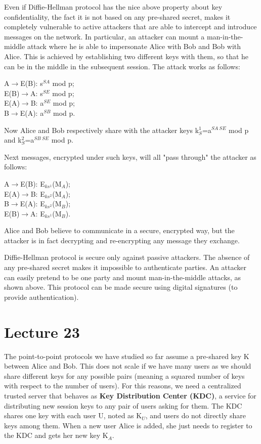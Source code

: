\documentclass[a4paper, 12pt]{report}
\begin{document}
Even if Diffie-Hellman protocol has the nice above property about key confidentiality, the fact it is not based on any pre-shared secret, makes it completely vulnerable to active attackers that are able to intercept and introduce messages on the network. In particular, an attacker can mount a man-in-the-middle attack where he is able to impersonate Alice with Bob and Bob with Alice. This is achieved by establishing two different keys with them, so that he can be in the middle in the subsequent session. The attack works as follows:

\begin{center}
	A$\rightarrow$E(B): s$^{SA}$ mod p;\\
	E(B)$\rightarrow$A: s$^{SE}$ mod p;\\
	E(A)$\rightarrow$B: a$^{SE}$ mod p;\\
	B$\rightarrow$E(A): a$^{SB}$ mod p. 
\end{center}
Now Alice and Bob respectively share with the attacker keys k$_S^1$=a$^{SA \ SE}$ mod p and k$_S^2$=a$^{SB \ SE}$ mod p.

Next messages, encrypted under such keys, will all "pass through" the attacker as follows:
\begin{center}
	A$\rightarrow$E(B): E$_{ks^1}$(M$_A$);\\
	E(A)$\rightarrow$B: E$_{ks^2}$(M$_A$);\\
	B$\rightarrow$E(A): E$_{ks^2}$(M$_B$);\\
	E(B)$\rightarrow$A: E$_{ks^1}$(M$_B$).
\end{center}

Alice and Bob believe to communicate in a secure, encrypted way, but the attacker is in fact decrypting and re-encrypting any message they exchange.

Diffie-Hellman protocol is secure only against passive attackers. The absence of any pre-shared secret makes it impossible to authenticate parties. An attacker can easily pretend to be one party and mount man-in-the-middle attacks, as shown above. This protocol can be made secure using digital signatures (to provide authentication).

\chapter*{Lecture 23}
The point-to-point protocols we have studied so far assume a pre-shared key K between Alice and Bob. This does not scale if we have many users as we should share different keys for any possible pairs (meaning a squared number of keys with respect to the number of users). For this reasons, we need a centralized trusted server that behaves as \textbf{Key Distribution Center (KDC)}, a service for distributing new session keys to any pair of users asking for them. The KDC shares one key with each user U, noted as K$_U$, and users do not directly share keys among them. When a new user Alice is added, she just needs to register to the KDC and gets her new key K$_A$.
\end{document}
